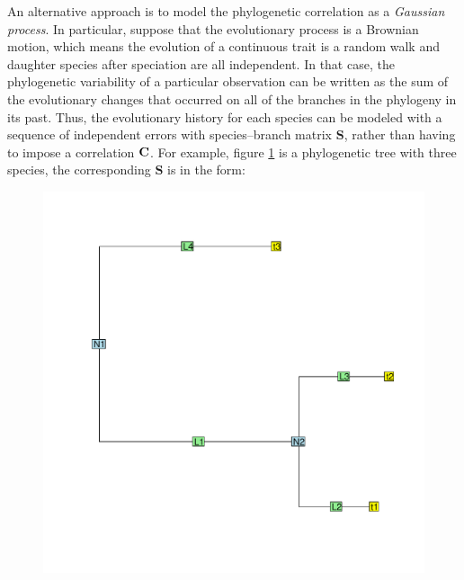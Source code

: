 \newcommand{\bS}{{\mathbf S}}
\newcommand{\bJ}{{\mathbf J}}
\newcommand{\bB}{{\mathbf B}}
\newcommand{\bBadj}{{\mathbf B}_{\mbox{\tiny adj}}}
\newcommand{\bomega}{{\boldsymbol \omega}}
\newcommand{\bell}{{\boldsymbol \ell}}
\newcommand{\e}{{ \epsilon}}

An alternative approach is to model the phylogenetic correlation as a \textit{Gaussian process}. 
In particular, suppose that the evolutionary process is a Brownian motion, which means the evolution of a continuous trait is a random walk and daughter species after speciation are all independent.  
In that case, the phylogenetic variability of a particular observation can be written as the sum of the evolutionary changes that occurred on all of the branches in the phylogeny in its past. 
Thus, the evolutionary history for each species can be modeled with a sequence of independent errors with species--branch matrix $\bS$, rather than having to impose a correlation ${\mathbf C}$.
For example, figure \ref{fig:tree} is a phylogenetic tree with three species, the corresponding $\bS$ is in the form:

\begin{center}
\begin{figure}[h]
  \includegraphics[scale=0.8,page=1]{./git_push/tree.pdf}
  \caption{}
\label{fig:tree}
\end{figure}
\end{center}

